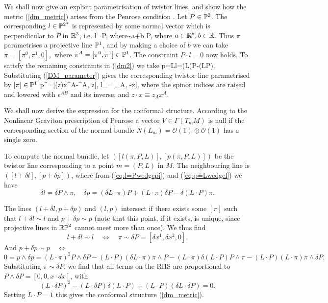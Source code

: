 We shall now give an explicit parametrisation of twistor lines, and show how 
the metric (\ref{dm_metric}) arises from the Penrose condition 
\cite{penrose, ward}.
Let $P\in \mathbb{P}^2$. The corresponding $l\in {\mathbb{P}^2}^*$ is represented by some normal vector which is perpendicular to $P$ in $\mathbb{R}^3$, i.e.
\be \label{eq:l=Pwedgepi}
l=P\wedge \pi, \quad \mbox{where}\quad  \pi\sim a\pi+b P,
\ee
where $a\in \mathbb{R}^*, b\in \mathbb{R}$. Thus $\pi$ parametrises a projective line $\mathbb{P}^1$,
and by making a choice of $b$ we can take
$
\pi=[\pi^0, \pi^1, 0], 
$ where $\pi^A=[\pi^0, \pi^1]\in \mathbb{P}^1$. The constraint $P\cdot l=0$ now holds.
To satisfy the remaining constraints in (\ref{dm2}) we take
\be \label{eq:p=Lwedgel}
p=L\wedge l=(L\cdot\pi)P-(L\cdot P)\pi.
\ee
Substituting (\ref{DM_parameter}) gives 
the corresponding twistor line parametrised by $[\pi]\in\mathbb{P}^1$ 
\be
\label{sl3curves}
p^{\alpha}=[(z\cdot \pi)x^A-\pi^A, z\cdot \pi], \quad l_\alpha=[\pi_A, -\pi\cdot x],
\ee
where the spinor indices are raised and lowered with $\epsilon^{AB}$ and its inverse, and  $z\cdot x\equiv z_Ax^A$. 

We shall now derive the expression for the conformal structure. According
to the Nonlinear Graviton prescription of Penrose \cite{penrose} a vector
$V\in \Gamma(T_mM)$ is null if the corresponding section
of the normal bundle $N(L_m)={\mathcal O}(1)\oplus{\mathcal O}(1)$ has a 
single zero. 


To compute the normal bundle, let $([l(\pi, P, L)], 
[p(\pi, P, L)])$
be the twistor line corresponding to a point $m=(P, L)$ in $M$. The neighbouring line is $([l+\delta l], [p+\delta p])$, where from (\ref{eq:l=Pwedgepi}) and (\ref{eq:p=Lwedgel}) we have
\[
\delta l=\delta P\wedge \pi, \quad
\delta p= (\delta L\cdot \pi)P+(L\cdot\pi) \delta P-\delta (L\cdot P)\pi.
\]

The lines  $(l+\delta l, p+\delta p)$  and $(l, p)$ intersect if there exists some $[\pi]$ such that $l+\delta l\sim l$ and $p+\delta p\sim p$ (note that this point, if it exists, is unique, since projective lines in $\mathbb{RP}^2$ cannot meet more than once). We thus find
\[
l+\delta l\sim l \quad \iff \quad\pi\sim\delta P=[\delta x^1, \delta x^2, 0].
\]
And $p+\delta p\sim p \quad \iff$
\[
0=p\wedge \delta p=(L\cdot \pi)^2P\wedge \delta P-(L\cdot P)
(\delta L\cdot \pi)\pi\wedge P-(L\cdot \pi)\delta (L\cdot P)P\wedge \pi-
(L\cdot P)(L\cdot \pi) \pi\wedge \delta P.
\]
Substituting $\pi\sim\delta P$, we find that all terms on the RHS are proportional to $P\wedge \delta P=[0, 0, x\cdot dx]$, with
\[
(L\cdot \delta P)^2-(L\cdot \delta P)\delta(L\cdot P)+(L\cdot P)(\delta L\cdot \delta P)=0.
\]
Setting $L\cdot P=1$ this gives the conformal structure 
(\ref{dm_metric}).
